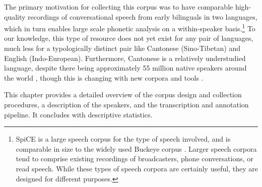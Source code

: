 The primary motivation for collecting this corpus was to have comparable high-quality recordings of conversational speech from early bilinguals in two languages, which in turn enables large scale phonetic analysis on a within-speaker basis.\footnote{SpiCE is a large speech corpus for the type of speech involved, and is comparable in size to the widely used Buckeye corpus \citep{pitt_2005_buckeye}. Larger speech corpora tend to comprise existing recordings of broadcasters, phone conversations, or read speech. While these types of speech corpora are certainly useful, they are designed for different purposes.} To our knowledge, this type of resource does not yet exist for any pair of languages, much less for a typologically distinct pair like Cantonese (Sino-Tibetan) and English (Indo-European). Furthermore, Cantonese is a relatively understudied language, despite there being approximately 55 million native speakers around the world \citep{matthews_2013_cantonese}, though this is changing with new corpora \citep{luke_2015_hkc,leung_2001_hkcac,winterstein_2020_cantomap,alderete_2019_tone} and tools \citep{lee_2018_pycantonese,yau_2019_pyjyutping}.

This chapter provides a detailed overview of the corpus design and collection procedures, a description of the speakers, and the transcription and annotation pipeline. It concludes with descriptive statistics. 

